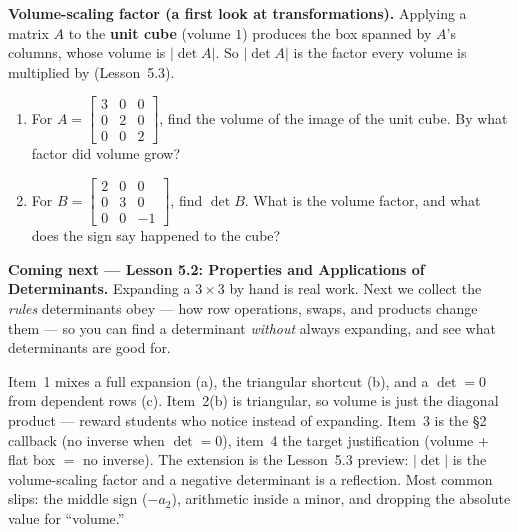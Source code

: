 \documentclass[10pt]{article}
\begin{document}
\begin{extensionbox}
\textbf{Volume-scaling factor (a first look at transformations).} Applying a matrix $A$ to the
\textbf{unit cube} (volume $1$) produces the box spanned by $A$'s columns, whose volume is $|\det A|$.
So $|\det A|$ is the factor every volume is multiplied by (Lesson~5.3).
\begin{enumerate}[label=(\alph*), leftmargin=1.8em, itemsep=5pt]
  \item For $A=\begin{bmatrix} 3 & 0 & 0 \\ 0 & 2 & 0 \\ 0 & 0 & 2 \end{bmatrix}$, find the volume of the image of the unit cube. By what factor did volume grow?
  \item For $B=\begin{bmatrix} 2 & 0 & 0 \\ 0 & 3 & 0 \\ 0 & 0 & -1 \end{bmatrix}$, find $\det B$. What is the volume factor, and what does the sign say happened to the cube?
\end{enumerate}
\end{extensionbox}

\begin{spiralbox}
\textbf{Coming next --- Lesson 5.2: Properties and Applications of Determinants.} Expanding a
$3\times3$ by hand is real work. Next we collect the \emph{rules} determinants obey --- how row
operations, swaps, and products change them --- so you can find a determinant \emph{without} always
expanding, and see what determinants are good for.
\end{spiralbox}

\begin{teachernote}
Item~1 mixes a full expansion (a), the triangular shortcut (b), and a $\det=0$ from dependent rows (c).
Item~2(b) is triangular, so volume is just the diagonal product --- reward students who notice instead
of expanding. Item~3 is the §2 callback (no inverse when $\det=0$), item~4 the target justification
(volume $+$ flat box $=$ no inverse). The extension is the Lesson~5.3 preview: $|\det|$ is the
volume-scaling factor and a negative determinant is a reflection. Most common slips: the middle sign
($-a_2$), arithmetic inside a minor, and dropping the absolute value for ``volume.''
\end{teachernote}
\end{document}
